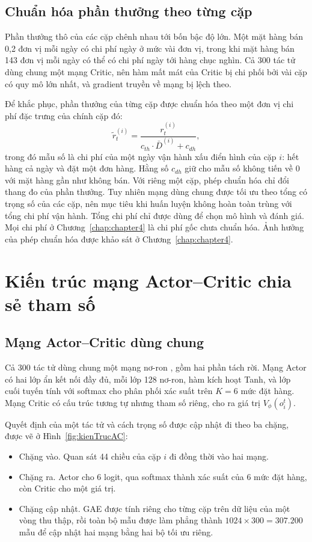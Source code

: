\subsection{Chuẩn hóa phần thưởng theo từng cặp}
\label{subsec:chuanHoaThuong}

Phần thưởng thô của các cặp chênh nhau tới bốn bậc độ lớn. Một mặt hàng bán 0,2 đơn vị mỗi ngày có chi phí ngày ở mức vài đơn vị, trong khi mặt hàng bán 143 đơn vị mỗi ngày có thể có chi phí ngày tới hàng chục nghìn. Cả 300 tác tử dùng chung một mạng Critic, nên hàm mất mát của Critic bị chi phối bởi vài cặp có quy mô lớn nhất, và gradient truyền về mạng bị lệch theo.

Để khắc phục, phần thưởng của từng cặp được chuẩn hóa theo một đơn vị chi phí đặc trưng của chính cặp đó:
\begin{equation}
    \tilde{r}_t^{(i)} = \frac{r_t^{(i)}}{c_{th} \cdot \bar{D}^{(i)} + c_{dh}},
    \label{eq:chuanHoaThuong}
\end{equation}
trong đó mẫu số là chi phí của một ngày vận hành xấu điển hình của cặp $i$: hết hàng cả ngày và đặt một đơn hàng. Hằng số $c_{dh}$ giữ cho mẫu số không tiến về 0 với mặt hàng gần như không bán. Với riêng một cặp, phép chuẩn hóa chỉ đổi thang đo của phần thưởng. Tuy nhiên mạng dùng chung được tối ưu theo tổng có trọng số của các cặp, nên mục tiêu khi huấn luyện không hoàn toàn trùng với tổng chi phí vận hành. Tổng chi phí chỉ được dùng để chọn mô hình và đánh giá. Mọi chi phí ở Chương~\ref{chap:chapter4} là chi phí gốc chưa chuẩn hóa. Ảnh hưởng của phép chuẩn hóa được khảo sát ở Chương~\ref{chap:chapter4}.

\section{Kiến trúc mạng Actor--Critic chia sẻ tham số}
\label{sec:kienTruc}

\subsection{Mạng Actor--Critic dùng chung}
\label{subsec:sharedNet}

Cả 300 tác tử dùng chung một mạng nơ-ron \parencite{gupta2017}, gồm hai phần tách rời. Mạng Actor có hai lớp ẩn kết nối đầy đủ, mỗi lớp 128 nơ-ron, hàm kích hoạt Tanh, và lớp cuối tuyến tính với softmax cho phân phối xác suất trên $K = 6$ mức đặt hàng. Mạng Critic có cấu trúc tương tự nhưng tham số riêng, cho ra giá trị $V_\phi(o_i^t)$.

Quyết định của một tác tử và cách trọng số được cập nhật đi theo ba chặng, được vẽ ở Hình~\ref{fig:kienTrucAC}:
\begin{itemize}
    \item Chặng vào. Quan sát 44 chiều của cặp $i$ đi đồng thời vào hai mạng.
    \item Chặng ra. Actor cho 6 logit, qua softmax thành xác suất của 6 mức đặt hàng, còn Critic cho một giá trị.
    \item Chặng cập nhật. GAE được tính riêng cho từng cặp trên dữ liệu của một vòng thu thập, rồi toàn bộ mẫu được làm phẳng thành $1024 \times 300 = 307.200$ mẫu để cập nhật hai mạng bằng hai bộ tối ưu riêng.
\end{itemize}

